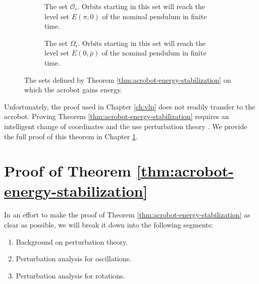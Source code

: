 \begin{figure}
    \centering
    \begin{subfigure}[t]{0.45\textwidth}
        \caption{The set \(\mathcal{O}_\epsilon\). Orbits starting in this set
            will reach the level set \(E(\pi,0)\) of the nominal pendulum in
            finite time.}
        \label{fig:O-epsilon}
    \end{subfigure}
    \hfill
    \begin{subfigure}[t]{0.45\textwidth}
        \caption{The set \(\Omega_\epsilon\). Orbits starting in this set will
            reach the level set \(E(0,\bar{\rho})\) of the nominal pendulum in
            finite time.}
        \label{fig:Omega-epsilon}
    \end{subfigure}
    \caption{The sets defined by Theorem \ref{thm:acrobot-energy-stabilization}
        on which the acrobot gains energy.}
\end{figure}

Unfortunately, the proof used in Chapter \ref{ch:vlp} does not
readily transfer to the acrobot.
Proving Theorem \ref{thm:acrobot-energy-stabilization} requires an intelligent
change of coordinates and the use perturbation
theory \cite{khalil_nonlinear}.
We provide the full proof of this theorem in Chapter \ref{sec:acrobot-proof}.
 
\section{Proof of Theorem \ref{thm:acrobot-energy-stabilization}}\label{sec:acrobot-proof}
In an effort to make the proof of Theorem \ref{thm:acrobot-energy-stabilization}
as clear as possible, we will break it down into the following segments:
\begin{enumerate}
    \item Background on perturbation theory.
    \item Perturbation analysis for oscillations.
    \item Perturbation analysis for rotations.
\end{enumerate}

